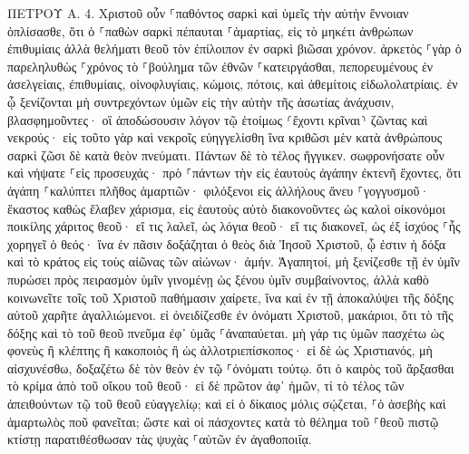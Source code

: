 \documentclass[twoside, 9pt]{extreport}
\begin{document}
ΠΕΤΡΟΥ Α.
4.
Χριστοῦ οὖν ⸀παθόντος σαρκὶ καὶ ὑμεῖς τὴν αὐτὴν ἔννοιαν ὁπλίσασθε, ὅτι ὁ ⸀παθὼν σαρκὶ πέπαυται ⸀ἁμαρτίας, 
εἰς τὸ μηκέτι ἀνθρώπων ἐπιθυμίαις ἀλλὰ θελήματι θεοῦ τὸν ἐπίλοιπον ἐν σαρκὶ βιῶσαι χρόνον. 
ἀρκετὸς ⸀γὰρ ὁ παρεληλυθὼς ⸀χρόνος τὸ ⸀βούλημα τῶν ἐθνῶν ⸀κατειργάσθαι, πεπορευμένους ἐν ἀσελγείαις, ἐπιθυμίαις, οἰνοφλυγίαις, κώμοις, πότοις, καὶ ἀθεμίτοις εἰδωλολατρίαις. 
ἐν ᾧ ξενίζονται μὴ συντρεχόντων ὑμῶν εἰς τὴν αὐτὴν τῆς ἀσωτίας ἀνάχυσιν, βλασφημοῦντες· 
οἳ ἀποδώσουσιν λόγον τῷ ἑτοίμως ⸂ἔχοντι κρῖναι⸃ ζῶντας καὶ νεκρούς· 
εἰς τοῦτο γὰρ καὶ νεκροῖς εὐηγγελίσθη ἵνα κριθῶσι μὲν κατὰ ἀνθρώπους σαρκὶ ζῶσι δὲ κατὰ θεὸν πνεύματι. 
Πάντων δὲ τὸ τέλος ἤγγικεν. σωφρονήσατε οὖν καὶ νήψατε ⸀εἰς προσευχάς· 
πρὸ ⸀πάντων τὴν εἰς ἑαυτοὺς ἀγάπην ἐκτενῆ ἔχοντες, ὅτι ἀγάπη ⸀καλύπτει πλῆθος ἁμαρτιῶν· 
φιλόξενοι εἰς ἀλλήλους ἄνευ ⸀γογγυσμοῦ· 
ἕκαστος καθὼς ἔλαβεν χάρισμα, εἰς ἑαυτοὺς αὐτὸ διακονοῦντες ὡς καλοὶ οἰκονόμοι ποικίλης χάριτος θεοῦ· 
εἴ τις λαλεῖ, ὡς λόγια θεοῦ· εἴ τις διακονεῖ, ὡς ἐξ ἰσχύος ⸀ἧς χορηγεῖ ὁ θεός· ἵνα ἐν πᾶσιν δοξάζηται ὁ θεὸς διὰ Ἰησοῦ Χριστοῦ, ᾧ ἐστιν ἡ δόξα καὶ τὸ κράτος εἰς τοὺς αἰῶνας τῶν αἰώνων· ἀμήν. 
Ἀγαπητοί, μὴ ξενίζεσθε τῇ ἐν ὑμῖν πυρώσει πρὸς πειρασμὸν ὑμῖν γινομένῃ ὡς ξένου ὑμῖν συμβαίνοντος, 
ἀλλὰ καθὸ κοινωνεῖτε τοῖς τοῦ Χριστοῦ παθήμασιν χαίρετε, ἵνα καὶ ἐν τῇ ἀποκαλύψει τῆς δόξης αὐτοῦ χαρῆτε ἀγαλλιώμενοι. 
εἰ ὀνειδίζεσθε ἐν ὀνόματι Χριστοῦ, μακάριοι, ὅτι τὸ τῆς δόξης καὶ τὸ τοῦ θεοῦ πνεῦμα ἐφ᾽ ὑμᾶς ⸀ἀναπαύεται. 
μὴ γάρ τις ὑμῶν πασχέτω ὡς φονεὺς ἢ κλέπτης ἢ κακοποιὸς ἢ ὡς ἀλλοτριεπίσκοπος· 
εἰ δὲ ὡς Χριστιανός, μὴ αἰσχυνέσθω, δοξαζέτω δὲ τὸν θεὸν ἐν τῷ ⸀ὀνόματι τούτῳ. 
ὅτι ὁ καιρὸς τοῦ ἄρξασθαι τὸ κρίμα ἀπὸ τοῦ οἴκου τοῦ θεοῦ· εἰ δὲ πρῶτον ἀφ᾽ ἡμῶν, τί τὸ τέλος τῶν ἀπειθούντων τῷ τοῦ θεοῦ εὐαγγελίῳ; 
καὶ εἰ ὁ δίκαιος μόλις σῴζεται, ⸀ὁ ἀσεβὴς καὶ ἁμαρτωλὸς ποῦ φανεῖται; 
ὥστε καὶ οἱ πάσχοντες κατὰ τὸ θέλημα τοῦ ⸀θεοῦ πιστῷ κτίστῃ παρατιθέσθωσαν τὰς ψυχὰς ⸀αὐτῶν ἐν ἀγαθοποιΐᾳ. 
\end{document}
